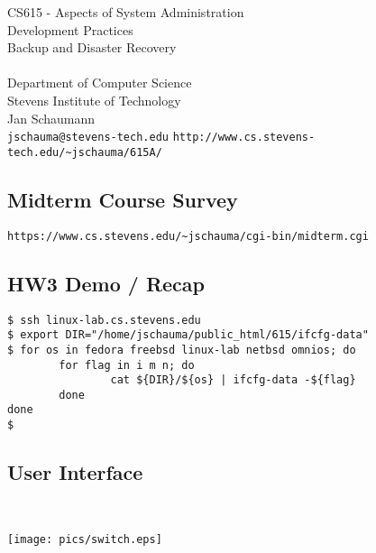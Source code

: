 \documentclass[xga]{xdvislides}
\begin{document}
\setfontphv

\lhead{\slidetitle}                               %
\cfoot{\relax}                               %
\rfoot{\Gray{\today}}

\newcommand{\smallish}{\fontsize{15}{20}\selectfont}

\vspace*{\fill}
\begin{center}
	\Hugesize
		CS615 - Aspects of System Administration\\ [1em]
		Development Practices \\ [1em]
		Backup and Disaster Recovery \\ [1em]
	\hspace*{5mm}\blueline\\ [1em]
	\Normalsize
		Department of Computer Science\\
		Stevens Institute of Technology\\
		Jan Schaumann\\
		\verb+jschauma@stevens-tech.edu+
		\verb+http://www.cs.stevens-tech.edu/~jschauma/615A/+
\end{center}
\vspace*{\fill}

\subsection{Midterm Course Survey}
\vspace*{\fill}
{\tt https://www.cs.stevens.edu/\~{}jschauma/cgi-bin/midterm.cgi}
\vspace*{\fill}


\subsection{HW3 Demo / Recap}
\begin{verbatim}
$ ssh linux-lab.cs.stevens.edu
$ export DIR="/home/jschauma/public_html/615/ifcfg-data"
$ for os in fedora freebsd linux-lab netbsd omnios; do
        for flag in i m n; do
                cat ${DIR}/${os} | ifcfg-data -${flag}
        done
done
$
\end{verbatim}

\subsection{User Interface}
\\
\vspace*{\fill}
\begin{center}
	\texttt{[image: pics/switch.eps]}
\end{center}
\vspace*{\fill}
\end{document}
